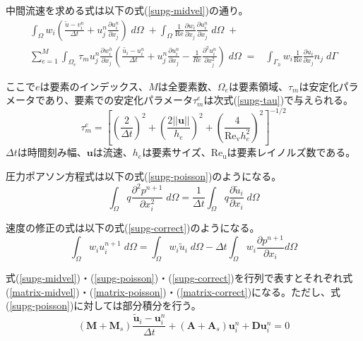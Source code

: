 \documentclass[8pt,a4paper]{article}
\newcommand{\bm}{\boldsymbol}
\begin{document}
中間流速を求める式は以下の式(\ref{supg-midvel})の通り。
\begin{equation}
\label{supg-midvel}
	\begin{split}
		\int_{\Omega} w_{i}\left( \frac{\tilde{u}-v^{n}_i}{\Delta t} + u^{n}_{j} \frac{\partial u^{n}_{i}}{\partial x_{j}}\right) \; d\Omega \;+ 
		\int_{\Omega} \frac{1}{\mathrm{Re}} \frac{\partial w_{i}}{\partial x_{j}} \frac{\partial u^{n}_{i}}{\partial x_{j}} \; d\Omega \;+& \\
		\sum_{e=1}^{M} \int_{\Omega_{e}} \tau_{m} u_{j}^{n} \frac{\partial w_{i}^{h}}{\partial x_{j}} \left( \frac{\tilde{u_{i}} - u_{i}^{n}}{\Delta t} + u_{j}^{n} \frac{\partial u_{i}^{n}}{\partial x_{j}} - \frac{1}{Re} \frac{\partial^{2} u_{i}^{n}}{\partial x_{j}^{2}}\right) \; d\Omega \;=& 
		\int_{\Gamma_{h}} w_{i}\frac{1}{\mathrm{Re}} \frac{\partial u_{i}}{\partial x_{j}}n_{j} \;d\Gamma
	\end{split}
\end{equation}

ここで$e$は要素のインデックス、$M$は全要素数、$\Omega_{e}$は要素領域、$\tau_{m}$は安定化パラメータであり、要素での安定化パラメータ$\tau_{m}^{e}$は次式(\ref{supg-tau})で与えられる。
\begin{equation}
\label{supg-tau}
	\tau_{m}^{e}=\left[ \left(\frac{2}{\Delta t}\right)^{2} + \left(\frac{2||\bm{u}||}{h_{e}}\right)^{2} + \left(\frac{4}{\mathrm{Re_{v}} h_{e}^{2}}\right)^{2}\right]^{-1/2}
\end{equation}
$\Delta t$は時間刻み幅、$\bm{u}$は流速、$h_e$は要素サイズ、$\mathrm{Re_u}$は要素レイノルズ数である。

圧力ポアソン方程式は以下の式(\ref{supg-poisson})のようになる。
\begin{equation}
\label{supg-poisson}
	\int_{\Omega} q \frac{\partial^{2}p^{n+1}}{\partial x_{i}^{2}} \; d\Omega = 
	\frac{1}{\Delta t} \int_{\Omega} q \frac{\partial \tilde{u}_{i}}{\partial x_{i}} \; d\Omega
\end{equation}

速度の修正の式は以下の式(\ref{supg-correct})のようになる。
\begin{equation}
\label{supg-correct}
	\int_{\Omega} w_{i}u_{i}^{n+1} \; d\Omega = \int_{\Omega} w_{i} \tilde{u}_{i} \; d\Omega
	- \Delta t \int_{\Omega} w_{i} \frac{\partial p^{n+1}}{\partial x_{i}} d\Omega
\end{equation}

式(\ref{supg-midvel})・(\ref{supg-poisson})・(\ref{supg-correct})を行列で表すとそれぞれ式(\ref{matrix-midvel})・(\ref{matrix-poisson})・(\ref{matrix-correct})になる。ただし、式(\ref{supg-poisson})に対しては部分積分を行う。
\begin{equation}
\label{matrix-midvel}
	( \bm{M} + \bm{M}_{s} ) \frac{\tilde{\bm{u}}_i - \bm{u}_{i}^{n}}{\Delta t} + ( \bm{A} + \bm{A}_s ) \bm{u}_{i}^{n} + \bm{D} \bm{u}_{i}^{n} = 0
\end{equation}
\end{document}
